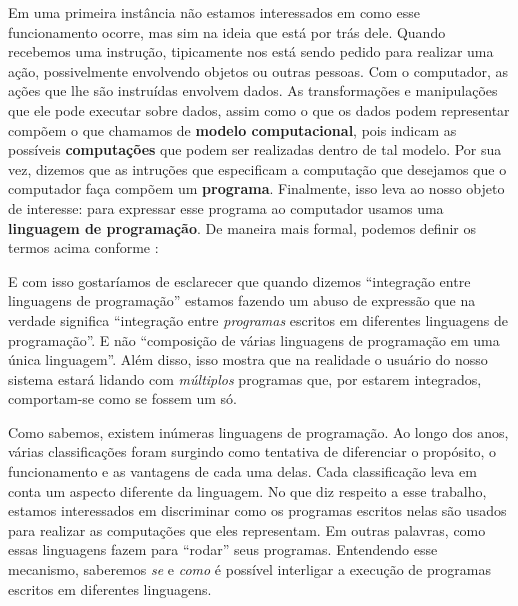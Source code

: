   Em uma primeira instância não estamos interessados em como esse funcionamento
  ocorre, mas sim na ideia que está por trás dele. Quando recebemos uma
  instrução, tipicamente nos está sendo pedido para realizar uma ação,
  possivelmente envolvendo objetos ou outras pessoas. Com o computador, as ações
  que lhe são instruídas envolvem dados\footnotemark{}. As transformações e
  manipulações que ele pode executar sobre dados, assim como o que os dados
  podem representar compõem o que chamamos de \textbf{modelo computacional},
  pois indicam as possíveis \textbf{computações} que podem ser realizadas dentro
  de tal modelo. Por sua vez, dizemos que as intruções que especificam a
  computação que desejamos que o computador faça compõem um \textbf{programa}.
  Finalmente, isso leva ao nosso objeto de interesse: para expressar esse
  programa ao computador usamos uma \textbf{linguagem de programação}. De
  maneira mais formal, podemos definir os termos acima conforme
  \cite[Introduction]{pl:00}:
  


  E com isso gostaríamos de esclarecer que quando dizemos ``integração entre
  linguagens de programação'' estamos fazendo um abuso de expressão que na
  verdade significa ``integração entre \emph{programas} escritos em diferentes
  linguagens de programação''. E não ``composição de várias linguagens de
  programação em uma única linguagem''. Além disso, isso mostra que na realidade
  o usuário do nosso sistema estará lidando com \emph{múltiplos} programas que,
  por estarem integrados, comportam-se como se fossem um só.

  Como sabemos, existem inúmeras linguagens de programação. Ao longo dos anos,
  várias classificações foram surgindo como tentativa de diferenciar o
  propósito, o funcionamento e as vantagens de cada uma delas. Cada
  classificação leva em conta um aspecto diferente da linguagem. No que diz
  respeito a esse trabalho, estamos interessados em discriminar como os
  programas escritos nelas são usados para realizar as computações que eles
  representam. Em outras palavras, como essas linguagens fazem para ``rodar''
  seus programas. Entendendo esse mecanismo, saberemos \emph{se} e \emph{como} é
  possível interligar a execução de programas escritos em diferentes linguagens.

